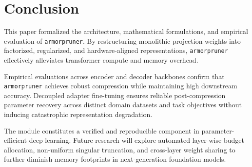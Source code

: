 \section{Conclusion}
This paper formalized the architecture, mathematical formulations, and empirical evaluation of \texttt{armorpruner}. By restructuring monolithic projection weights into factorized, regularized, and hardware-aligned representations, \texttt{armorpruner} effectively alleviates transformer compute and memory overhead.

Empirical evaluations across encoder and decoder backbones confirm that \texttt{armorpruner} achieves robust compression while maintaining high downstream accuracy. Decoupled adapter fine-tuning ensures reliable post-compression parameter recovery across distinct domain datasets and task objectives without inducing catastrophic representation degradation.

The module constitutes a verified and reproducible component in parameter-efficient deep learning. Future research will explore automated layer-wise budget allocation, non-uniform singular truncation, and cross-layer weight sharing to further diminish memory footprints in next-generation foundation models.
